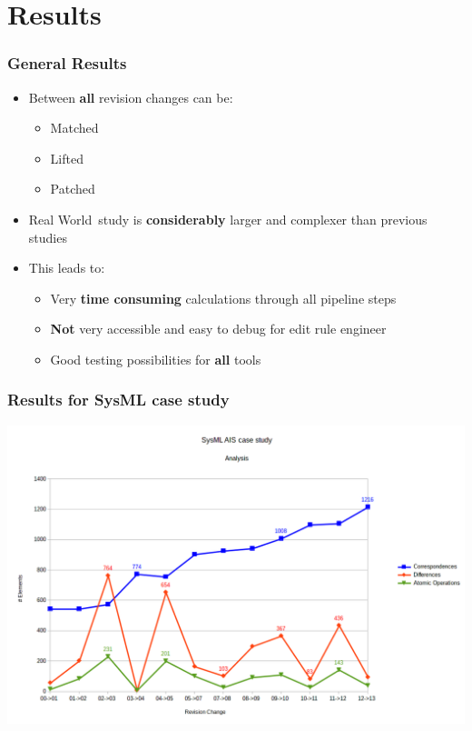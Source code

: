 \documentclass[10pt]{beamer}
\begin{document}
\section{Results}
\begin{frame}
\frametitle{General Results}
\begin{itemize}
  \item Between \textbf{all} revision changes can be:
  \begin{itemize}
    \item Matched
    \item Lifted
    \item Patched
  \end{itemize}
  \item \glqq Real World\grqq\ study is \textbf{considerably} larger and
  complexer than previous studies
  \item This leads to:
  \begin{itemize}
    \item Very \textbf{time consuming} calculations through all pipeline steps
    \item \textbf{Not} very accessible and easy to debug for edit rule engineer
    \item Good testing possibilities for \textbf{all} tools 
  \end{itemize}    
\end{itemize}
\end{frame}
\begin{frame}
\frametitle{Results for SysML case study}
\begin{center}
\includegraphics[scale=0.35]{revisionChanges_analysis}\\
\end{center}
\end{frame}
\end{document}
